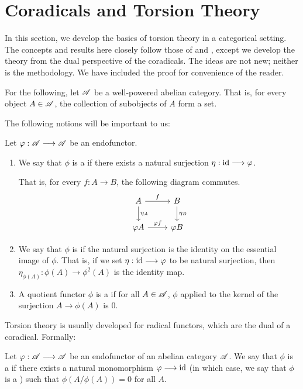 \newpage
\section{Coradicals and Torsion Theory}\label{sect_torsion_theory}

In this section, we develop the basics of torsion theory in a 
categorical setting. The concepts and results here closely follow
those of \cite{BJV} and \cite{DTor}, except we develop the theory
from the dual perspective of the coradicals. The ideas are not new;
neither is the methodology. We have included the proof for 
convenience of the reader.

For the following, let $\mathscr{A}$ be a well-powered abelian category.
That is, for every object $A \in \mathscr{A}$, the collection of 
subobjects of $A$ form a set.

The following notions will be important to us:

\begin{defn}\label{def_coradical}
Let $\varphi: \mathscr{A} \longrightarrow \mathscr{A}$ be an endofunctor. 
\begin{enumerate}
\item We say that $\phi$ is a  if there 
exists a natural surjection $\eta: \mathrm{id} \longrightarrow \varphi$. 

That is, for every $f: A \to B$, the following diagram commutes.
\[
\begin{tikzcd}
A \arrow{r}{f} \arrow{d}{\eta_A} &
B \arrow{d}{\eta_B} \\
\phi A \arrow{r}{\phi f} 
&\phi B
\end{tikzcd}
\]

\item We say that $\phi$ is  if the natural 
surjection is the identity on the essential image of $\phi$.
That is, if we set $\eta: \mathrm{id} \longrightarrow \varphi$ to be natural surjection,
then $\eta_{\phi(A)}: \phi(A) \to \phi^2(A)$ is the identity map.

\item A quotient functor $\phi$ is a  if for all
$A \in \mathscr{A}$, $\phi$ applied to the kernel of the surjection 
$A \to \phi(A)$ is $0$.
\end{enumerate}
\end{defn}

Torsion theory is usually developed for radical functors, which 
are the dual of a coradical. Formally:

\begin{defn}\label{def_radical}
Let $\varphi: \mathscr{A} \longrightarrow \mathscr{A}$ be an endofunctor of an abelian 
category $\mathscr{A}$. We say that $\phi$ is a  if 
there exists a natural monomorphism $\varphi \longrightarrow \mathrm{id}$ (in which case, we
say that $\phi$ is a ) such that 
$\phi(A/\phi(A)) = 0$ for all $A$. 
\end{defn}

